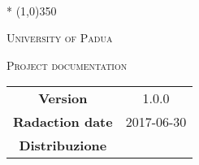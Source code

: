 \documentclass[a4paper,12pt]{article}
\date{2017-05-10}
\begin{document}
	\begin{titlepage}
		\centering
		{\huge\bfseries \nomeprogetto\par}
		\sottotitolo \\*
		\line(1,0){350} \\
		{\scshape\LARGE University of Padua \par}
		\vspace{1cm}
		{\scshape\Large Project documentation \par}
		\logo
		\newpage
		\begin{tabular}{c|c}
			{\hfill \textbf{Version}} 			& 1.0.0						\\ 
			{\hfill\textbf{Radaction date}} 	& 2017-06-30 		\\ 
			{\hfill\textbf{Distribuzione}} 		& \abujari \\
		\end{tabular}
	\end{titlepage}
	
	\pagestyle{myfront}
	\newpage
	\tableofcontents
	\newpage
	\listoftables
	\newpage
	\listoffigures
	
	\label{LastFrontPage}	
	\newpage	
	\pagestyle{mymain}
				
	\newpage	
		
%			
%		
		
	\label{LastPage}
\end{document}
